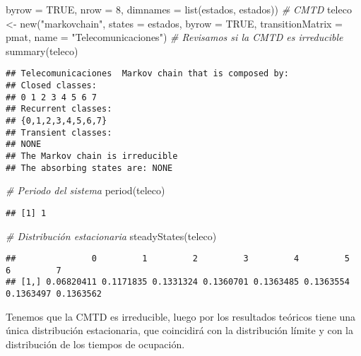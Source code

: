 \documentclass[
]{book}
\newenvironment{Shaded}{\begin{snugshade}}{\end{snugshade}}
\newcommand{\AttributeTok}[1]{\textcolor[rgb]{0.77,0.63,0.00}{#1}}
\newcommand{\CommentTok}[1]{\textcolor[rgb]{0.56,0.35,0.01}{\textit{#1}}}
\newcommand{\ConstantTok}[1]{\textcolor[rgb]{0.00,0.00,0.00}{#1}}
\newcommand{\DecValTok}[1]{\textcolor[rgb]{0.00,0.00,0.81}{#1}}
\newcommand{\FunctionTok}[1]{\textcolor[rgb]{0.00,0.00,0.00}{#1}}
\newcommand{\NormalTok}[1]{#1}
\newcommand{\OtherTok}[1]{\textcolor[rgb]{0.56,0.35,0.01}{#1}}
\newcommand{\StringTok}[1]{\textcolor[rgb]{0.31,0.60,0.02}{#1}}
\theoremstyle{definition}
\theoremstyle{definition}
\theoremstyle{definition}
\theoremstyle{definition}
\theoremstyle{remark}
\begin{document}
\begin{Shaded}
\begin{Highlighting}[]
               \AttributeTok{byrow =} \ConstantTok{TRUE}\NormalTok{, }\AttributeTok{nrow =} \DecValTok{8}\NormalTok{, }
               \AttributeTok{dimnames =} \FunctionTok{list}\NormalTok{(estados, estados))}
\CommentTok{\# CMTD}
\NormalTok{teleco }\OtherTok{\textless{}{-}} \FunctionTok{new}\NormalTok{(}\StringTok{"markovchain"}\NormalTok{, }\AttributeTok{states =}\NormalTok{ estados, }
                 \AttributeTok{byrow =} \ConstantTok{TRUE}\NormalTok{, }\AttributeTok{transitionMatrix =}\NormalTok{ pmat, }
              \AttributeTok{name =} \StringTok{"Telecomunicaciones"}\NormalTok{)}
\CommentTok{\# Revisamos si la CMTD es irreducible}
\FunctionTok{summary}\NormalTok{(teleco)}
\end{Highlighting}
\end{Shaded}

\begin{verbatim}
## Telecomunicaciones  Markov chain that is composed by: 
## Closed classes: 
## 0 1 2 3 4 5 6 7 
## Recurrent classes: 
## {0,1,2,3,4,5,6,7}
## Transient classes: 
## NONE 
## The Markov chain is irreducible 
## The absorbing states are: NONE
\end{verbatim}

\begin{Shaded}
\begin{Highlighting}[]
\CommentTok{\# Periodo del sistema}
\FunctionTok{period}\NormalTok{(teleco)}
\end{Highlighting}
\end{Shaded}

\begin{verbatim}
## [1] 1
\end{verbatim}

\begin{Shaded}
\begin{Highlighting}[]
\CommentTok{\# Distribución estacionaria}
\FunctionTok{steadyStates}\NormalTok{(teleco)}
\end{Highlighting}
\end{Shaded}

\begin{verbatim}
##               0         1         2         3         4         5         6         7
## [1,] 0.06820411 0.1171835 0.1331324 0.1360701 0.1363485 0.1363554 0.1363497 0.1363562
\end{verbatim}

Tenemos que la CMTD es irreducible, luego por los resultados teóricos tiene una única distribución estacionaria, que coincidirá con la distribución límite y con la distribución de los tiempos de ocupación.
\end{document}

